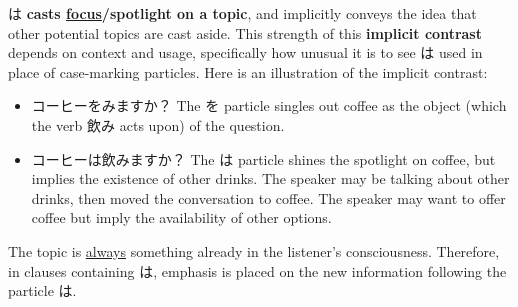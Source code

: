 \documentclass[../nihongo-gakushuu-kyouzai.tex]{subfiles}
\begin{document}
は \textbf{casts \ul{focus}/spotlight on a topic}, and implicitly conveys the idea that other potential topics are cast aside. This strength of this \textbf{implicit contrast} depends on context and usage, specifically how unusual it is to see は used in place of case-marking particles. Here is an illustration of the implicit contrast:
\begin{itemize}
    \item コーヒーをみますか？ The を particle singles out coffee as the object (which the verb 飲み acts upon) of the question.
    \item コーヒーは飲みますか？ The は particle shines the spotlight on coffee, but implies the existence of other drinks. The speaker may be talking about other drinks, then moved the conversation to coffee. The speaker may want to offer coffee but imply the availability of other options.
\end{itemize}

The topic is \ul{always} something already in the listener's consciousness. Therefore, in clauses containing は, emphasis is placed on the new information following the particle は.
\end{document}
